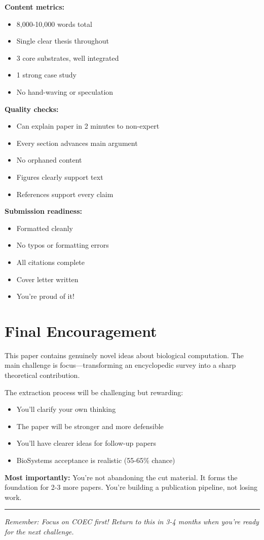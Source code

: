 \documentclass[11pt]{article}
\begin{document}
\textbf{Content metrics:}
\begin{itemize}
    \item 8,000-10,000 words total
    \item Single clear thesis throughout
    \item 3 core substrates, well integrated
    \item 1 strong case study
    \item No hand-waving or speculation
\end{itemize}

\textbf{Quality checks:}
\begin{itemize}
    \item Can explain paper in 2 minutes to non-expert
    \item Every section advances main argument
    \item No orphaned content
    \item Figures clearly support text
    \item References support every claim
\end{itemize}

\textbf{Submission readiness:}
\begin{itemize}
    \item Formatted cleanly
    \item No typos or formatting errors
    \item All citations complete
    \item Cover letter written
    \item You're proud of it!
\end{itemize}

\section{Final Encouragement}

This paper contains genuinely novel ideas about biological computation. The main challenge is focus—transforming an encyclopedic survey into a sharp theoretical contribution.

The extraction process will be challenging but rewarding:
\begin{itemize}
    \item You'll clarify your own thinking
    \item The paper will be stronger and more defensible
    \item You'll have clearer ideas for follow-up papers
    \item BioSystems acceptance is realistic (55-65\% chance)
\end{itemize}

\textbf{Most importantly:} You're not abandoning the cut material. It forms the foundation for 2-3 more papers. You're building a publication pipeline, not losing work.

\vspace{2em}
\hrule
\vspace{1em}

\textit{Remember: Focus on COEC first! Return to this in 3-4 months when you're ready for the next challenge.}
\end{document}
